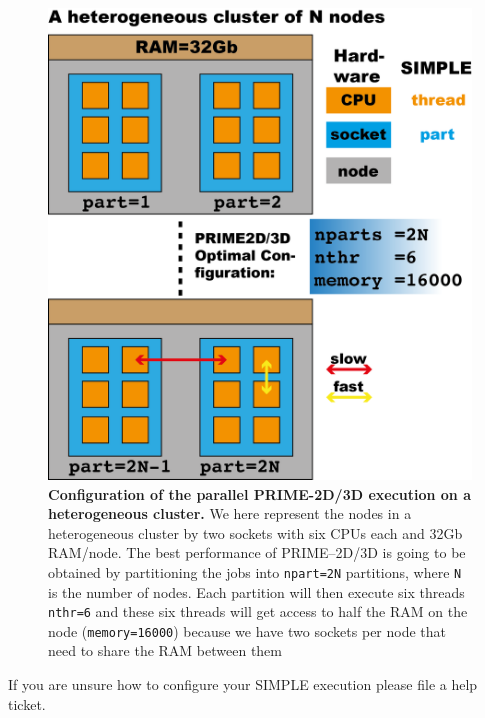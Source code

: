 \documentclass[a4paper,11pt]{article}
\begin{document}
\begin{figure}
\includegraphics[keepaspectratio=true,scale=0.6]{../CPUtopo/cputopo}
\caption{\textbf{Configuration of the parallel PRIME-2D/3D execution on a heterogeneous cluster.} We here represent the nodes in  a heterogeneous cluster by two sockets with six CPUs each and 32Gb RAM/node. The best performance of PRIME--2D/3D is going to be obtained by partitioning  the jobs into \texttt{npart=2N} partitions, where \texttt{N} is the number of nodes. Each partition will then execute six threads \texttt{nthr=6} and these six threads will get access to half the RAM on the node (\texttt{memory=16000}) because we have two sockets per node that need to share the RAM between them}
\end{figure}
If you are unsure how to configure your SIMPLE execution please file a help ticket.
\end{document}
